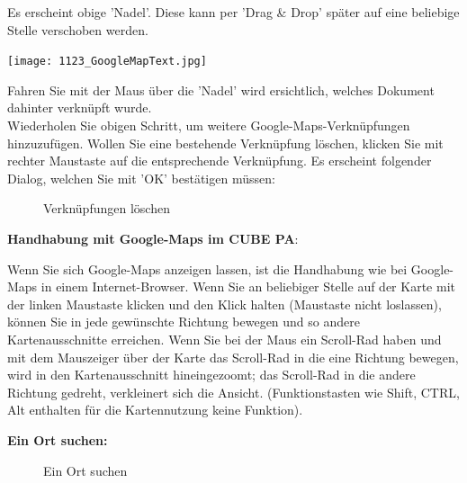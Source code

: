 Es erscheint obige 'Nadel'. Diese kann per 'Drag \& Drop' später auf eine beliebige Stelle verschoben werden.

\hspace{15mm} \texttt{[image: 1123\_GoogleMapText.jpg]}

Fahren Sie mit der Maus über die 'Nadel' wird ersichtlich, welches Dokument dahinter verknüpft wurde. \\

Wiederholen Sie obigen Schritt, um weitere Google-Maps-Verknüpfungen hinzuzufügen. Wollen Sie eine bestehende Verknüpfung löschen, klicken Sie mit rechter Maustaste auf die entsprechende Verknüpfung. Es erscheint folgender Dialog, welchen Sie mit 'OK' bestätigen müssen: 

\begin{figure}[H]
\caption{Verknüpfungen löschen}
\end{figure}

\vspace{\baselineskip}
\pagebreak

\textbf{Handhabung mit Google-Maps im CUBE PA}:

Wenn Sie sich Google-Maps anzeigen lassen, ist die Handhabung wie bei Google-Maps in einem Internet-Browser. Wenn Sie an beliebiger Stelle auf der Karte mit der linken Maustaste klicken und den Klick halten (Maustaste nicht loslassen), können Sie in jede gewünschte Richtung bewegen und so andere Kartenausschnitte erreichen. Wenn Sie bei der Maus ein Scroll-Rad haben und mit dem Mauszeiger über der Karte das Scroll-Rad in die eine Richtung bewegen, wird in den Kartenausschnitt hineingezoomt; das Scroll-Rad in die andere Richtung gedreht, verkleinert sich die Ansicht. (Funktionstasten wie Shift, CTRL, Alt enthalten für die Kartennutzung keine Funktion).

\vspace{\baselineskip}

\textbf{Ein Ort suchen:} 

\begin{figure}[H]
\caption{Ein Ort suchen}
\end{figure}


